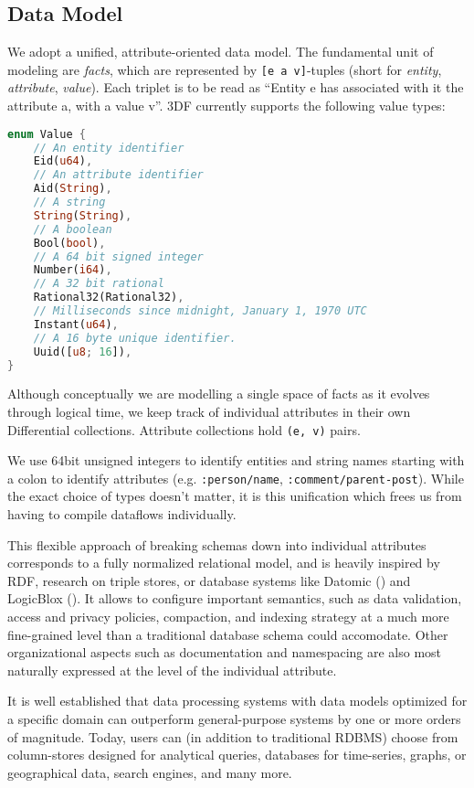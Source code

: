 \documentclass[../index.tex]{subfiles}
\begin{document}
\subsection{Data Model}

We adopt a unified, attribute-oriented data model. The fundamental
unit of modeling are \emph{facts}, which are represented by \texttt{[e
    a v]}-tuples (short for \emph{entity}, \emph{attribute},
\emph{value}). Each triplet is to be read as ``Entity e has associated
with it the attribute a, with a value v''. 3DF currently supports the
following value types:

\begin{lstlisting}[language=Rust, style=colouredRust]
enum Value {
    // An entity identifier
    Eid(u64),
    // An attribute identifier
    Aid(String),
    // A string
    String(String),
    // A boolean
    Bool(bool),
    // A 64 bit signed integer
    Number(i64),
    // A 32 bit rational
    Rational32(Rational32),
    // Milliseconds since midnight, January 1, 1970 UTC
    Instant(u64),
    // A 16 byte unique identifier.
    Uuid([u8; 16]),
}
\end{lstlisting}

Although conceptually we are modelling a single space of facts as it
evolves through logical time, we keep track of individual attributes
in their own Differential collections. Attribute collections hold
\texttt{(e, v)} pairs.

We use 64bit unsigned integers to identify entities and string names
starting with a colon to identify attributes
(e.g. \texttt{:person/name}, \texttt{:comment/parent-post}). While the
exact choice of types doesn't matter, it is this unification which
frees us from having to compile dataflows individually.

This flexible approach of breaking schemas down into individual
attributes corresponds to a fully normalized relational model, and is
heavily inspired by RDF, research on triple stores, or database
systems like Datomic (\cite{datomic}) and LogicBlox
(\cite{aref2015design}). It allows to configure important semantics,
such as data validation, access and privacy policies, compaction, and
indexing strategy at a much more fine-grained level than a traditional
database schema could accomodate. Other organizational aspects such as
documentation and namespacing are also most naturally expressed at the
level of the individual attribute.

It is well established that data processing systems with data models
optimized for a specific domain can outperform general-purpose systems
by one or more orders of magnitude. Today, users can (in addition to
traditional RDBMS) choose from column-stores designed for analytical
queries, databases for time-series, graphs, or geographical data,
search engines, and many more.
\end{document}
